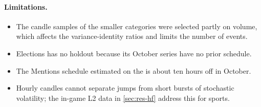 \paragraph{Limitations.}
\begin{itemize}
\item The candle samples of the smaller categories were selected partly on volume, which affects
  the variance-identity ratios and limits the number of events.
\item Elections has no holdout because its October series have no prior schedule.
\item The Mentions schedule estimated on the \estim{} is about ten hours off in October.
\item Hourly candles cannot separate jumps from short bursts of stochastic volatility; the in-game
  L2 data in \cref{sec:res-hf} address this for sports.
\end{itemize}
